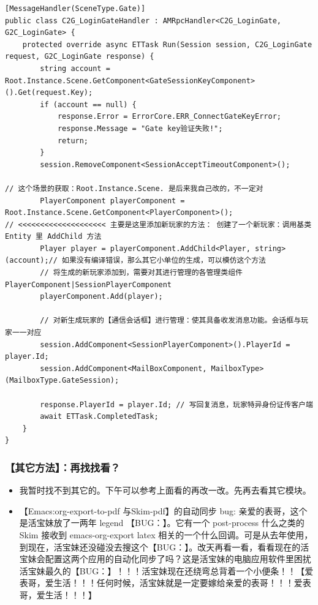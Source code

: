 \documentclass[9pt, b5paper]{article}
\begin{document}
\begin{verbatim}
[MessageHandler(SceneType.Gate)]
public class C2G_LoginGateHandler : AMRpcHandler<C2G_LoginGate, G2C_LoginGate> {
    protected override async ETTask Run(Session session, C2G_LoginGate request, G2C_LoginGate response) {
        string account = Root.Instance.Scene.GetComponent<GateSessionKeyComponent>().Get(request.Key);
        if (account == null) {
            response.Error = ErrorCore.ERR_ConnectGateKeyError;
            response.Message = "Gate key验证失败!";
            return;
        } 
        session.RemoveComponent<SessionAcceptTimeoutComponent>();

// 这个场景的获取：Root.Instance.Scene. 是后来我自己改的，不一定对
        PlayerComponent playerComponent = Root.Instance.Scene.GetComponent<PlayerComponent>(); 
// <<<<<<<<<<<<<<<<<<<< 主要是这里添加新玩家的方法： 创建了一个新玩家：调用基类Entity 里 AddChild 方法
        Player player = playerComponent.AddChild<Player, string>(account);// 如果没有编译错误，那么其它小单位的生成，可以模仿这个方法 
        // 将生成的新玩家添加到，需要对其进行管理的各管理类组件 PlayerComponent|SessionPlayerComponent
        playerComponent.Add(player);

        // 对新生成玩家的【通信会话框】进行管理：使其具备收发消息功能。会话框与玩家一一对应
        session.AddComponent<SessionPlayerComponent>().PlayerId = player.Id;
        session.AddComponent<MailBoxComponent, MailboxType>(MailboxType.GateSession);

        response.PlayerId = player.Id; // 写回复消息，玩家特异身份证传客户端
        await ETTask.CompletedTask;
    }
}
\end{verbatim}
\subsubsection{【其它方法】：再找找看？}
\label{sec-9-5-2}
\begin{itemize}
\item 我暂时找不到其它的。下午可以参考上面看的再改一改。先再去看其它模块。
\item 【Emacs:org-export-to-pdf 与Skim-pdf】的自动同步 bug: 亲爱的表哥，这个是活宝妹放了一两年 legend 【BUG：】。它有一个 post-process 什么之类的Skim 接收到 emacs-org-export latex 相关的一个什么回调。可是从去年使用，到现在，活宝妹还没碰没去搜这个【BUG：】。改天再看一看，看看现在的活宝妹会配置这两个应用的自动化同步了吗？这是活宝妹的电脑应用软件里困扰活宝妹最久的【BUG：】！！！活宝妹现在还绕弯总背着一个小便条！！【爱表哥，爱生活！！！任何时候，活宝妹就是一定要嫁给亲爱的表哥！！！爱表哥，爱生活！！！】
\end{itemize}
\end{document}
